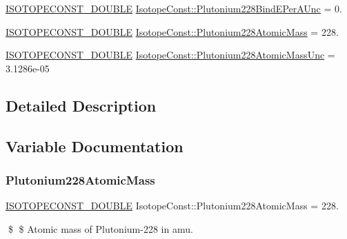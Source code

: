 \begin{DoxyCompactItemize}
\mbox{\hyperlink{group___isotope_const-_macros_ga8f45a7272ce02c0b4c65c44636ed719a}{I\+S\+O\+T\+O\+P\+E\+C\+O\+N\+S\+T\+\_\+\+D\+O\+U\+B\+LE}} \mbox{\hyperlink{group___isotope_const-_plutonium-_pu228_gafd89f91451c89d6757595bcc1dfad365}{Isotope\+Const\+::\+Plutonium228\+Bind\+E\+Per\+A\+Unc}} = 0.
\item 
\mbox{\hyperlink{group___isotope_const-_macros_ga8f45a7272ce02c0b4c65c44636ed719a}{I\+S\+O\+T\+O\+P\+E\+C\+O\+N\+S\+T\+\_\+\+D\+O\+U\+B\+LE}} \mbox{\hyperlink{group___isotope_const-_plutonium-_pu228_gac7aa2c4f0015ff38ba9707a3f4e00794}{Isotope\+Const\+::\+Plutonium228\+Atomic\+Mass}} = 228.
\item 
\mbox{\hyperlink{group___isotope_const-_macros_ga8f45a7272ce02c0b4c65c44636ed719a}{I\+S\+O\+T\+O\+P\+E\+C\+O\+N\+S\+T\+\_\+\+D\+O\+U\+B\+LE}} \mbox{\hyperlink{group___isotope_const-_plutonium-_pu228_gab98bd299a3f23d19d4bcdc2dfb03489b}{Isotope\+Const\+::\+Plutonium228\+Atomic\+Mass\+Unc}} = 3.\+1286e-\/05
\end{DoxyCompactItemize}


\subsection{Detailed Description}


\subsection{Variable Documentation}
\mbox{\label{group___isotope_const-_plutonium-_pu228_gac7aa2c4f0015ff38ba9707a3f4e00794}} 
\subsubsection{\texorpdfstring{Plutonium228\+Atomic\+Mass}{Plutonium228AtomicMass}}
{\footnotesize\ttfamily \mbox{\hyperlink{group___isotope_const-_macros_ga8f45a7272ce02c0b4c65c44636ed719a}{I\+S\+O\+T\+O\+P\+E\+C\+O\+N\+S\+T\+\_\+\+D\+O\+U\+B\+LE}} Isotope\+Const\+::\+Plutonium228\+Atomic\+Mass = 228.}

\$ \$ Atomic mass of Plutonium-\/228 in amu. \mbox{\label{group___isotope_const-_plutonium-_pu228_gab98bd299a3f23d19d4bcdc2dfb03489b}} 
